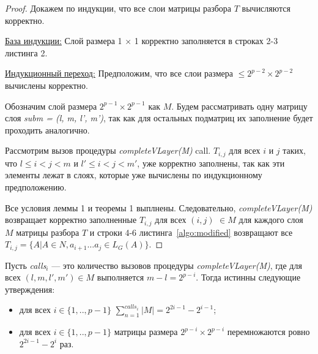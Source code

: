 \begin{proof}

Докажем по индукции, что все слои матрицы разбора $T$ вычисляются корректно.

\underline{База индукции:} Слой размера 1 × 1 корректно заполняется в строках 2-3 листинга 2.

\underline{Индукционный переход:} Предположим, что все слои размера $\le 2^{p - 2} \times 2^{p - 2}$ вычислены корректно.

Обозначим слой размера $2^{p - 1} \times 2^{p - 1}$ как $M$. Будем рассматривать одну матрицу слоя \textit{subm = (l, m, l', m')}, так как для остальных подматриц их заполнение будет проходить аналогично.

Рассмотрим вызов процедуры \textit{completeVLayer(M)} call.
$T_{i,j}$ для всех $i$ и $j$ таких, что $l \leq i < j < m$ и $l' \leq i < j < m'$, уже корректно заполнены, так как эти элементы лежат в слоях, которые уже вычислены по индукционному предположению.

Все условия леммы 1 и теоремы 1 выплнены. Следовательно, \textit{completeVLayer(M)} возвращает корректно заполненные $T_{i, j}$ для всех $(i, j)$ $\in M$ для каждого слоя $M$ матрицы разбора $T$ и строки 4-6 листинга~\ref{algo:modified} возвращают все $T_{i, j} =  \{ A | A \in N, a_{i + 1} \dots a_{j} \in L_{G}(A)\}$.

\end{proof}

\begin{lm}
Пусть \textit{calls$_{i}$} --- это количество вызовов процедуры \textit{completeVLayer(M)}, где для всех $(l, m, l', m') \in M$ выполняется $m - l = 2^{p - i}$. Тогда истинны следующие утверждения:
\begin{itemize}
 \item для всех $i \in \{ 1, .., p - 1\}$  $\sum_{n=1}^{calls_i}{|M|} = 2^{2i - 1} - 2^{i - 1}$;
 \item для всех $ i \in \{ 1, .., p - 1\}$ матрицы размера $2^{p - i} \times 2^{p - i}$ перемножаются ровно $2^{2i - 1} - 2^{i}$ раз.
\end{itemize}
\end{lm}

